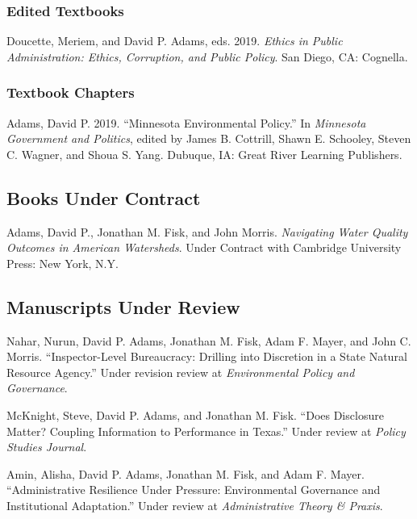 \documentclass[12pt,letterpaper]{article}
\renewenvironment{itemize}{
  \begin{list}{}{
    \setlength{\leftmargin}{1.5em}
    \setlength{\itemsep}{0.25em}
    \setlength{\parskip}{0pt}
    \setlength{\parsep}{0.25em}
  }
}{
  \end{list}
}
\begin{document}
\subsubsection*{Edited Textbooks}
\begin{itemize}\leftmargin=2pt\itemindent=-15pt
  \item Doucette, Meriem, and David P. Adams, eds. 2019. \emph{Ethics in Public Administration: Ethics, Corruption, and Public Policy}. San Diego, CA: Cognella.
\end{itemize}

\subsubsection*{Textbook Chapters}
\begin{itemize}\leftmargin=2pt\itemindent=-15pt
  \item Adams, David P. 2019. ``Minnesota Environmental Policy.'' In \emph{Minnesota Government and Politics}, edited by James B. Cottrill, Shawn E. Schooley, Steven C. Wagner, and Shoua S. Yang. Dubuque, IA: Great River Learning Publishers.
\end{itemize}

\subsection*{Books Under Contract}

\begin{itemize}\leftmargin=2pt\itemindent=-15pt\leftmargin=2pt\itemindent=-15pt
  \item Adams, David P., Jonathan M. Fisk, and John Morris. \emph{Navigating Water Quality Outcomes in American Watersheds}. Under Contract with Cambridge University Press: New York, N.Y.
\end{itemize}

\subsection*{Manuscripts Under Review}
\begin{itemize}\leftmargin=2pt\itemindent=-15pt\leftmargin=2pt\itemindent=-15pt
  
  \item Nahar, Nurun, David P. Adams, Jonathan M. Fisk, Adam F. Mayer, and John C. Morris. ``Inspector-Level Bureaucracy: Drilling into Discretion in a State Natural Resource Agency.'' Under revision review at \emph{Environmental Policy and Governance}.
  
  \item McKnight, Steve, David P. Adams, and Jonathan M. Fisk. ``Does Disclosure Matter? Coupling Information to Performance in Texas.'' Under review at \emph{Policy Studies Journal}.

  \item Amin, Alisha, David P. Adams, Jonathan M. Fisk, and Adam F. Mayer. ``Administrative Resilience Under Pressure: Environmental Governance and Institutional Adaptation.'' Under review at \emph{Administrative Theory \& Praxis}.

\end{itemize}
\end{document}
